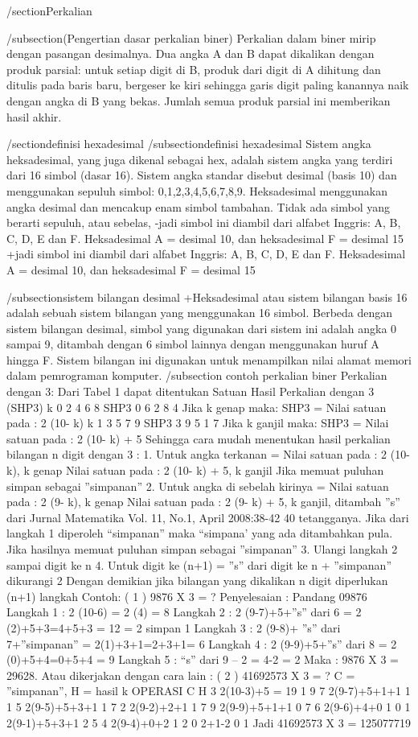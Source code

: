 /section{Perkalian}
 
 /subsection(Pengertian dasar perkalian biner)
  Perkalian dalam biner mirip dengan pasangan desimalnya. Dua angka A dan B dapat dikalikan dengan produk parsial: 
  untuk setiap digit di B, produk dari digit di A dihitung dan ditulis pada baris baru, bergeser ke kiri sehingga 
  garis digit paling kanannya naik dengan angka di B yang bekas. Jumlah semua produk parsial ini memberikan hasil akhir.
  
 /section{definisi hexadesimal}
 /subsection{definisi hexadesimal}
  Sistem angka heksadesimal, yang juga dikenal sebagai hex, adalah sistem angka yang terdiri dari 16 simbol (dasar 16). 
  Sistem angka standar disebut desimal (basis 10) dan menggunakan sepuluh simbol: 0,1,2,3,4,5,6,7,8,9. Heksadesimal 
  menggunakan angka desimal dan mencakup enam simbol tambahan. Tidak ada simbol yang berarti sepuluh, atau sebelas, 
 -jadi simbol ini diambil dari alfabet Inggris: A, B, C, D, E dan F. Heksadesimal A = desimal 10, dan heksadesimal F = desimal 15
 +jadi simbol ini diambil dari alfabet Inggris: A, B, C, D, E dan F. Heksadesimal A = desimal 10, dan heksadesimal F = desimal 15
 
 /subsection{sistem bilangan desimal}
 +Heksadesimal atau sistem bilangan basis 16 adalah sebuah sistem bilangan yang menggunakan 16 simbol. Berbeda dengan sistem bilangan desimal, simbol yang digunakan dari sistem ini adalah angka 0 sampai 9, ditambah dengan 6 simbol lainnya dengan menggunakan huruf A hingga F. Sistem bilangan ini digunakan untuk menampilkan nilai alamat memori dalam pemrograman komputer.
/subsection {contoh perkalian biner}
Perkalian dengan 3:
Dari Tabel 1 dapat ditentukan
Satuan Hasil Perkalian dengan 3 (SHP3)
k 0 2 4 6 8
SHP3 0 6 2 8 4
Jika k genap maka:
SHP3 = Nilai satuan pada : 2 (10- k)
k 1 3 5 7 9
SHP3 3 9 5 1 7
Jika k ganjil maka:
SHP3 = Nilai satuan pada : 2 (10- k) + 5
Sehingga cara mudah menentukan hasil
perkalian bilangan n digit dengan 3 :
1. Untuk angka terkanan =
Nilai satuan pada : 2 (10- k), k genap
Nilai satuan pada : 2 (10- k) + 5,
k ganjil
Jika memuat puluhan simpan sebagai
”simpanan”
2. Untuk angka di sebelah kirinya =
Nilai satuan pada : 2 (9- k), k genap
Nilai satuan pada : 2 (9- k) + 5,
k ganjil, ditambah ”s” dari
Jurnal Matematika Vol. 11, No.1, April 2008:38-42
40
tetangganya.
Jika dari langkah 1 diperoleh
“simpanan” maka “simpana’ yang ada
ditambahkan pula.
Jika hasilnya memuat puluhan simpan
sebagai ”simpanan”
3. Ulangi langkah 2 sampai digit ke n
4. Untuk digit ke (n+1) =
”s” dari digit ke n + ”simpanan”
dikurangi 2
Dengan demikian jika bilangan yang
dikalikan n digit diperlukan (n+1) langkah
Contoh:
( 1 ) 9876 X 3 = ?
Penyelesaian : Pandang 09876
Langkah 1 : 2 (10-6) = 2 (4) = 8
Langkah 2 : 2 (9-7)+5+”s” dari 6
= 2 (2)+5+3=4+5+3 = 12
= 2 simpan 1
Langkah 3 : 2 (9-8)+
”s” dari 7+”simpanan”
= 2(1)+3+1=2+3+1= 6
Langkah 4 : 2 (9-9)+5+”s” dari 8
= 2 (0)+5+4=0+5+4 = 9
Langkah 5 : “s” dari 9 – 2 = 4-2 = 2
Maka : 9876 X 3 = 29628.
Atau dikerjakan dengan cara lain :
( 2 ) 41692573 X 3 = ?
C = ”simpanan”, H = hasil
k OPERASI C H
3 2(10-3)+5 = 19 1 9
7 2(9-7)+5+1+1 1 1
5 2(9-5)+5+3+1 1 7
2 2(9-2)+2+1 1 7
9 2(9-9)+5+1+1 0 7
6 2(9-6)+4+0 1 0
1 2(9-1)+5+3+1 2 5
4 2(9-4)+0+2 1 2
0 2+1-2 0 1
Jadi 41692573 X 3 = 125077719
